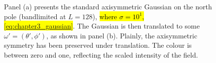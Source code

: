 \begin{figure}[htpb]
	\centering\capstart{}
	\hfill
	\caption[
		A Gaussian on the north pole and then translated
	]{
		Panel (a) presents the standard axisymmetric Gaussian on the north pole (bandlimited at \(L=128\)), \hl{where \mbox{\(\sigma=10^{1}\)}, \cf{} \mbox{\cref{eq:chapter3_gaussian}}}.
		The Gaussian is then translated to some \(\omega'=(\theta',\phi')\), as shown in panel (b).
		Plainly, the axisymmetric symmetry has been preserved under translation.
		The colour is between zero and one, reflecting the scaled intensity of the field.
	}\label{fig:chapter3_gaussian}
\end{figure}
